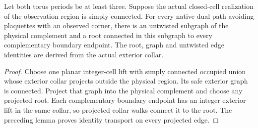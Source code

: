 \begin{lemma}
    \label{lem:peps_flux_untwisted_boundary_component}
    \leanok
    Let both torus periods be at least three. Suppose the actual closed-cell realization of the observation region
    is simply connected. For every native dual path avoiding plaquettes
    with an observed corner, there is an untwisted subgraph of the physical
    complement and a root connected in this subgraph to every complementary
    boundary endpoint. The root, graph and untwisted edge identities are
    derived from the actual exterior collar.
\end{lemma}
\begin{proof}\leanok
    Choose one planar integer-cell lift with simply connected occupied
    union whose exterior collar projects outside the physical region.
    Its safe exterior graph is connected. Project that graph into the
    physical complement and choose any projected root. Each complementary
    boundary endpoint has an integer exterior lift in the same collar,
    so projected collar walks connect it to the root. The preceding lemma
    proves identity transport on every projected edge.
\end{proof}
